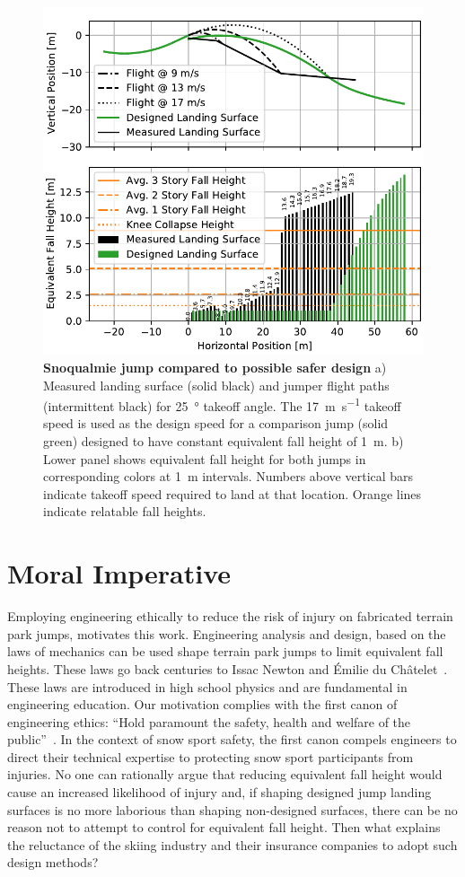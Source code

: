\documentclass{article}
\begin{document}
\begin{figure}
  \centering
  \includegraphics[width=5.25in]{figures/salvini-v-snoqualmie.pdf}
  \caption{\textbf{Snoqualmie jump compared to possible safer design}
  a) Measured landing surface (solid black) and jumper flight paths (intermittent
  black) for 25~\si{\degree} takeoff angle. The
  17~\si{\meter\per\second} takeoff speed is used as the design speed for a comparison
  jump (solid green) designed to have constant equivalent fall height of 1~\si{\meter}.
  b) Lower panel shows equivalent fall height for both jumps
  in corresponding colors at 1~\si{\meter} intervals. Numbers above
  vertical bars indicate takeoff speed required
  to land at that location. Orange lines indicate relatable fall heights.}
  \label{fig:salvini-v-snoqualmie}
\end{figure}

\section{Moral Imperative}
%
Employing engineering ethically to reduce the risk of injury on fabricated
terrain park jumps, motivates this work. Engineering analysis and design, based
on the laws of mechanics can be used shape terrain park jumps to limit
equivalent fall heights. These laws go back centuries to Issac Newton and
Émilie du Châtelet~\cite{Zinsser2007}. These laws are introduced in high school physics and
are fundamental in engineering education. Our motivation complies with the
first canon of engineering ethics: ``Hold paramount the safety, health and
welfare of the public''~\cite{NSPE2019}. In the context of snow sport safety,
the first canon compels engineers to direct their technical expertise to
protecting snow sport participants from injuries. No one can rationally argue
that reducing equivalent fall height would cause an increased likelihood of
injury and, if shaping designed jump landing surfaces is no more laborious than
shaping non-designed surfaces, there can be no reason not to attempt to control
for equivalent fall height. Then what explains the reluctance of the skiing
industry and their insurance companies to adopt such design methods?
\end{document}
